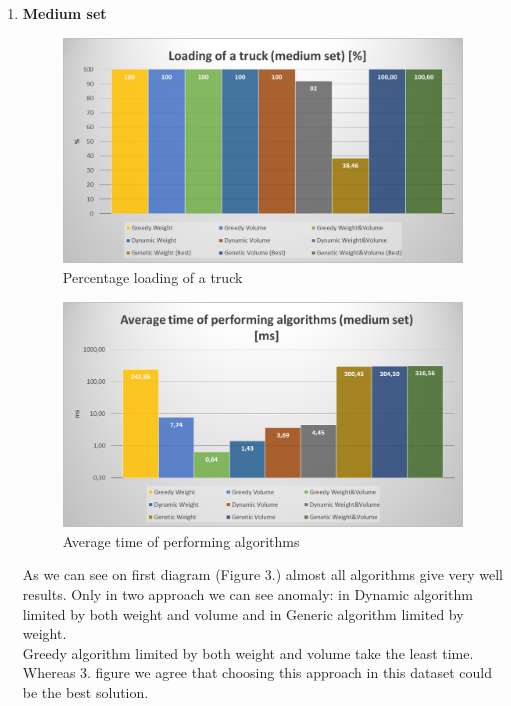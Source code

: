 \documentclass[conference,compsoc]{IEEEtran}
\begin{document}
\begin{enumerate}
\item \textbf{Medium set}
\begin{figure}[H]
  \centering
  \includegraphics[width=\columnwidth]{image013.png}
  \caption{Percentage loading of a truck }
\end{figure}

\begin{figure}[H]
  \centering
  \includegraphics[width=\columnwidth]{image019.png}
  \caption{Average time of performing algorithms}
\end{figure}

As we can see on first diagram (Figure 3.) almost all algorithms give very well results. Only in two approach we can see anomaly: in Dynamic algorithm limited by both weight and volume and in Generic algorithm limited by weight.\\

Greedy algorithm limited by both weight and volume take the least time. Whereas 3. figure we agree that choosing this approach in this dataset could be the best solution.\\


\end{enumerate}
\end{document}
